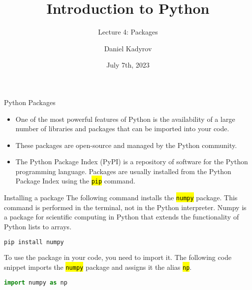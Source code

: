 \documentclass[
    aspectratio=169, 
    usepdftitle=false, 
    xcolor={dvipsnames},
    hyperref={
        colorlinks,
        linkcolor=black,
        urlcolor=blue}
    ]{beamer}
\title[Introduction to Python]{Introduction to Python}
\subtitle{Lecture 4: Packages}
\author{Daniel Kadyrov}
\date{July 7th, 2023}
\let\OldTexttt\texttt
\renewcommand{\texttt}[1]{\OldTexttt{\hl{#1}}}%
\begin{document}
\begin{frame}
    \titlepage
\end{frame}

\begin{frame}{Python Packages}
    \begin{itemize}
    \item One of the most powerful features of Python is the availability of a large number of libraries and packages that can be imported into your code.
    \item These packages are open-source and managed by the Python community.
    \item The Python Package Index (PyPI) is a repository of software for the Python programming language. Packages are usually installed from the Python Package Index using the \texttt{pip} command.
    \end{itemize}
\end{frame}

\begin{frame}[fragile]{Installing a package}
    The following command installs the \texttt{numpy} package. This command is performed in the terminal, not in the Python interpreter. Numpy is a package for scientific computing in Python that extends the functionality of Python lists to arrays.

    \begin{lstlisting}[language=bash]
pip install numpy
    \end{lstlisting}

    To use the package in your code, you need to import it. The following code snippet imports the \texttt{numpy} package and assigns it the alias \texttt{np}.

    \begin{lstlisting}[language=Python]
import numpy as np
    \end{lstlisting}
\end{frame}
\end{document}
